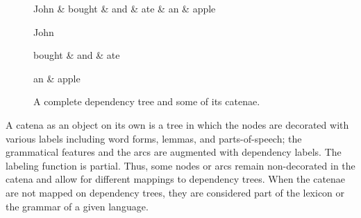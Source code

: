 \documentclass[output=paper]{langsci/langscibook}
\begin{document}
\begin{figure}
  \centering
\begin{dependency}[theme = simple]
   \begin{deptext}[column sep=1em]
    John \& bought \& and \& ate \& an \& apple \\
   \end{deptext}
   \end{dependency}

\begin{dependency}[theme = simple]
   \begin{deptext}[column sep=0.5em]
         John \\
   \end{deptext}
   \end{dependency}
\quad%
\begin{dependency}[theme = simple]
   \begin{deptext}[column sep=0.5em]
         bought \& and \& ate \\
   \end{deptext}
   \end{dependency}
\quad%
\begin{dependency}[theme = simple]
   \begin{deptext}[column sep=0.5em]
         an \& apple\\
   \end{deptext}
   \end{dependency}


  \caption{A complete dependency tree and some of its catenae.}
  \label{fig:CatenaExamples}
\end{figure}


A catena as an object on its own is a tree in which the nodes are decorated
with various labels including word forms, lemmas, and parts-of-speech; the
grammatical features and the arcs are augmented with dependency labels. The
labeling function is partial. Thus, some nodes or arcs remain
non-decorated in the catena and allow for different mappings to dependency
trees. When the catenae are not mapped on dependency trees, they are considered part of
the lexicon or the grammar of a given language.
\end{document}
